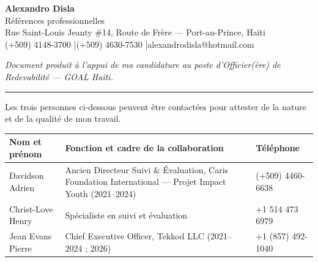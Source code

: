 \documentclass[11pt,a4paper]{article}
\begin{document}
\begin{center}
    {\LARGE\bfseries\color{cvblue} Alexandro Disla}\\[2pt]
    {\large Références professionnelles}\\[6pt]
    {\small Rue Saint-Louis Jeanty \#14, Route de Frère --- Port-au-Prince, Haïti\\
    (+509) 4148-3700 \quad|\quad (+509) 4630-7530 \quad|\quad alexandrodisla@hotmail.com}
\end{center}

\vspace{4pt}
{\small\itshape Document produit à l'appui de ma candidature au poste d'Officier(ère) de
Redevabilité --- GOAL Haïti.}

\vspace{10pt}
\hrule
\vspace{14pt}

Les trois personnes ci-dessous peuvent être contactées pour attester de la nature et de la qualité
de mon travail.

\vspace{10pt}
\renewcommand{\arraystretch}{1.4}
\begin{tabular}{L{3.4cm} L{8cm} L{3.8cm}}
\toprule
\textbf{Nom et prénom} & \textbf{Fonction et cadre de la collaboration} & \textbf{Téléphone} \\
\midrule
Davidson Adrien & Ancien Directeur Suivi \& Évaluation, Caris Foundation International --- Projet Impact Youth (2021--2024) & (+509) 4460-6638 \\
\addlinespace
Christ-Love Henry & Spécialiste en suivi et évaluation & +1 514 473 6979 \\
\addlinespace
Jean Evans Pierre & Chief Executive Officer, Tekkod LLC (2021--2024 ; 2026) & +1 (857) 492-1040 \\
\bottomrule
\end{tabular}
\end{document}
